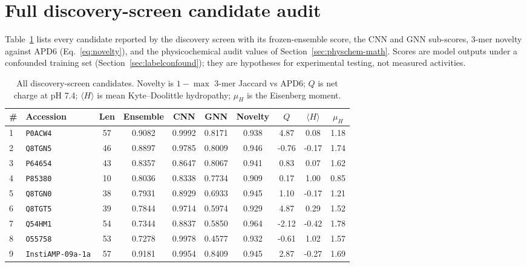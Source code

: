 
\section{Full discovery-screen candidate audit}\label{app:cand-full}
Table~\ref{tab:candfull} lists every candidate reported by the discovery
screen with its frozen-ensemble score, the CNN and GNN sub-scores, 3-mer
novelty against APD6 (Eq.~\eqref{eq:novelty}), and the physicochemical
audit values of Section~\ref{sec:physchem-math}. Scores are model
outputs under a confounded training set (Section~\ref{sec:labelconfound});
they are hypotheses for experimental testing, not measured activities.

\begin{table}[h]\centering\scriptsize
\caption{All discovery-screen candidates. Novelty is $1 - \max$ 3-mer
Jaccard vs APD6; $Q$ is net charge at pH 7.4; $\langle H\rangle$ is mean
Kyte--Doolittle hydropathy; $\mu_H$ is the Eisenberg moment.}
\label{tab:candfull}
\begin{tabular}{llcccccccc}
\hline
\# & Accession & Len & Ensemble & CNN & GNN & Novelty & $Q$ & $\langle H\rangle$ & $\mu_H$ \\
\hline
1 & \texttt{P0ACW4} & 57 & 0.9082 & 0.9992 & 0.8171 & 0.938 & 4.87 & 0.08 & 1.18 \\
2 & \texttt{Q8TGN5} & 46 & 0.8897 & 0.9785 & 0.8009 & 0.946 & -0.76 & -0.17 & 1.74 \\
3 & \texttt{P64654} & 43 & 0.8357 & 0.8647 & 0.8067 & 0.941 & 0.83 & 0.07 & 1.62 \\
4 & \texttt{P85380} & 10 & 0.8036 & 0.8338 & 0.7734 & 0.909 & 0.17 & 1.00 & 0.85 \\
5 & \texttt{Q8TGN0} & 38 & 0.7931 & 0.8929 & 0.6933 & 0.945 & 1.10 & -0.17 & 1.21 \\
6 & \texttt{Q8TGT5} & 39 & 0.7844 & 0.9714 & 0.5974 & 0.929 & 4.87 & 0.29 & 1.52 \\
7 & \texttt{Q54HM1} & 54 & 0.7344 & 0.8837 & 0.5850 & 0.964 & -2.12 & -0.42 & 1.78 \\
8 & \texttt{O55758} & 53 & 0.7278 & 0.9978 & 0.4577 & 0.932 & -0.61 & 1.02 & 1.57 \\
9 & \texttt{InstiAMP-09a-1a} & 57 & 0.9181 & 0.9954 & 0.8409 & 0.945 & 2.87 & -0.27 & 1.69 \\
\hline
\end{tabular}
\end{table}

